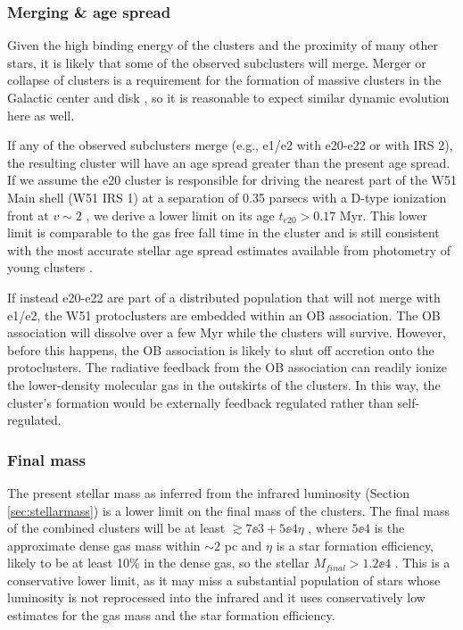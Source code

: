 \subsubsection{Merging \& age spread}
\label{sec:merging}
Given the high binding energy of the clusters and the proximity of many other
stars, it is likely that some of the observed subclusters will merge.  Merger
or collapse of clusters is a requirement for the formation of massive
clusters in the Galactic center and disk \citep{Walker2016a}, so it is reasonable to
expect similar dynamic evolution here as well.

If any of the observed subclusters merge (e.g., e1/e2 with e20-e22 or with
IRS 2), the
resulting cluster will have an age spread greater than the present
age spread.  If we assume the e20 cluster is responsible for driving the
nearest part of the W51 Main shell (W51 IRS 1) at a separation of 0.35 parsecs with a
D-type ionization front at $v\sim2$ \kms, we derive a lower limit on its age
$t_{e20} > 0.17$ Myr.  This lower limit is comparable to the gas free fall time
in the cluster and is still consistent with the most accurate stellar age
spread estimates available from photometry of young clusters
\citep[e.g.,][]{Kudryavtseva2012a}.

If instead e20-e22 are part of a distributed population that will not merge
with e1/e2, the W51 protoclusters are embedded within an OB association.  The
OB association will dissolve over a few Myr while the clusters will survive.
However, before this happens, the OB association is likely to shut off
accretion onto the protoclusters.  The radiative feedback from the OB
association can readily ionize the lower-density molecular gas in the outskirts
of the clusters.  In this way, the cluster's formation would be externally
feedback regulated rather than self-regulated.



\subsubsection{Final mass}
The present stellar mass as inferred from the infrared luminosity (Section
\ref{sec:stellarmass}) is a lower limit on the final mass of the clusters.  The
final mass of the combined clusters will be at least $\gtrsim7\ee{3} + 5\ee{4} \eta$ \msun,
where $5\ee{4}$ \msun is the approximate dense gas mass within $\sim2$ pc and
$\eta$ is a star formation efficiency, likely to be at least 10\% in the dense
gas, so the stellar $M_{final} > 1.2\ee{4}$ \msun.  This is a conservative lower
limit, as it may miss a substantial population of stars whose luminosity is not
reprocessed into the infrared and it uses conservatively low estimates for the 
gas mass and the star formation efficiency.

